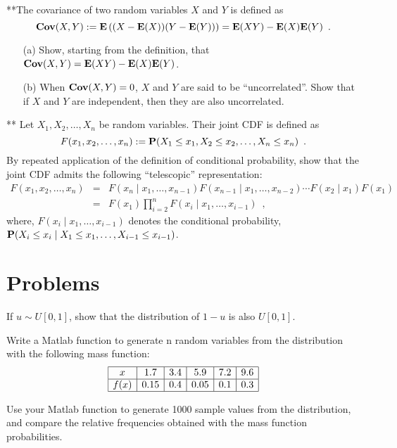 \begin{ExerciseList}
\Exercise
{**}The covariance of two random variables $X$ and $Y$ is defined as
\[
\mathbf{Cov}(X,Y) := \mathbf{E} \left((X-\mathbf{E}(X))(Y-\mathbf{E}(Y))\right) = \mathbf{E}(X Y) - \mathbf{E}(X) \mathbf{E}(Y) \enspace .
\]
\begin{itemize}
\item[(a)] Show, starting from the definition, that $\mathbf{Cov}(X,Y) = \mathbf{E}(XY)-\mathbf{E}(X) \mathbf{E}(Y)$.
\item[(b)] When $\mathbf{Cov}(X,Y)=0$, $X$ and $Y$ are said to be ``uncorrelated''.  
Show that if $X$ and $Y$ are independent, then they are also uncorrelated.
\end{itemize}

\Exercise
{**} Let $X_1,X_2,\ldots,X_n$ be random variables.  
Their joint CDF is defined as 
\[
F(x_1,x_2,\ldots,x_n) := \mathbf{P} (X_1 \leq x_1, X_2 \leq x_2, \ldots, X_n \leq x_n) \enspace.
\]
By repeated application of the definition of conditional probability, show that the joint CDF admits the following ``telescopic'' representation:
\begin{eqnarray*}
F(x_1,x_2,\ldots,x_n)
&=&
F(x_n \mid x_1,\ldots,x_{n-1}) F(x_{n-1} \mid x_1,\ldots,x_{n-2})\cdots F(x_2 \mid x_1) F(x_1)\\
&=&
F(x_1) \prod_{i=2}^n F(x_i \mid x_1,\ldots,x_{i-1}) \enspace ,
\end{eqnarray*}
where, $F(x_i \mid x_1,\ldots,x_{i-1})$ denotes the conditional probability, $\mathbf{P}(X_i \leq x_i \mid X_1 \leq x_1,\ldots,X_{i-1} \leq x_{i-1})$. 
\end{ExerciseList}

\section{Problems}
\begin{exercise}
If $u\sim U[0,1]$, show that the distribution of $1-u$ is also $U[0,1]$.
\end{exercise}

\begin{exercise}
Write a Matlab function to generate n random variables from the distribution with the following mass function:
$$\begin{array}{|c|c|c|c|c|c|}\hline
x	&1.7	&3.4	&5.9	&7.2&	9.6\\ \hline
f(x)	&0.15&	0.4	&0.05	&0.1	&0.3\\ \hline
\end{array}$$

Use your Matlab function to generate 1000 sample values from the distribution, and compare the relative frequencies obtained with the mass function probabilities.
\end{exercise}

